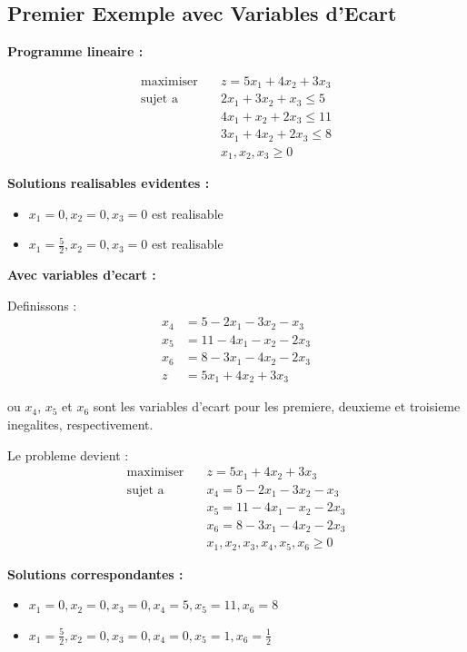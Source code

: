 \documentclass[12pt,a4paper]{article}
\begin{document}
\newpage
\subsection{Premier Exemple avec Variables d'Ecart}

\begin{exemple}
\textbf{Programme lineaire :}

\begin{align*}
\text{maximiser} \quad & z = 5x_1 + 4x_2 + 3x_3\\
\text{sujet a} \quad & 2x_1 + 3x_2 + x_3 \leq 5\\
& 4x_1 + x_2 + 2x_3 \leq 11\\
& 3x_1 + 4x_2 + 2x_3 \leq 8\\
& x_1, x_2, x_3 \geq 0
\end{align*}

\textbf{Solutions realisables evidentes :}
\begin{itemize}
    \item $x_1 = 0, x_2 = 0, x_3 = 0$ est realisable
    \item $x_1 = \frac{5}{2}, x_2 = 0, x_3 = 0$ est realisable
\end{itemize}
\end{exemple}

\begin{exemple}
\textbf{Avec variables d'ecart :}

Definissons :
\begin{align*}
x_4 &= 5 - 2x_1 - 3x_2 - x_3\\
x_5 &= 11 - 4x_1 - x_2 - 2x_3\\
x_6 &= 8 - 3x_1 - 4x_2 - 2x_3\\
z &= 5x_1 + 4x_2 + 3x_3
\end{align*}

ou $x_4$, $x_5$ et $x_6$ sont les variables d'ecart pour les premiere, deuxieme et troisieme inegalites, respectivement.

Le probleme devient :
\begin{align*}
\text{maximiser} \quad & z = 5x_1 + 4x_2 + 3x_3\\
\text{sujet a} \quad & x_4 = 5 - 2x_1 - 3x_2 - x_3\\
& x_5 = 11 - 4x_1 - x_2 - 2x_3\\
& x_6 = 8 - 3x_1 - 4x_2 - 2x_3\\
& x_1, x_2, x_3, x_4, x_5, x_6 \geq 0
\end{align*}

\textbf{Solutions correspondantes :}
\begin{itemize}
    \item $x_1 = 0, x_2 = 0, x_3 = 0, x_4 = 5, x_5 = 11, x_6 = 8$
    \item $x_1 = \frac{5}{2}, x_2 = 0, x_3 = 0, x_4 = 0, x_5 = 1, x_6 = \frac{1}{2}$
\end{itemize}
\end{exemple}
\end{document}
